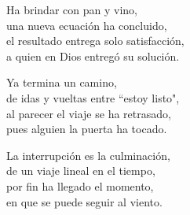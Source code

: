 \begin{center}
\vspace{1em} 
Ha brindar con pan y vino,\\ 
una nueva ecuación ha concluido,\\ 
el resultado entrega solo satisfacción,\\ 
a quien en Dios entregó su solución.

\vspace{1em} 
Ya termina un camino,\\ 
de idas y vueltas entre ``estoy listo",\\ 
al parecer el viaje se ha retrasado,\\ 
pues alguien la puerta ha tocado.

\vspace{1em} 
La interrupción es la culminación,\\ 
de un viaje lineal en el tiempo,\\ 
por fin ha llegado el momento,\\ 
en que se puede seguir al viento.


\end{center}




